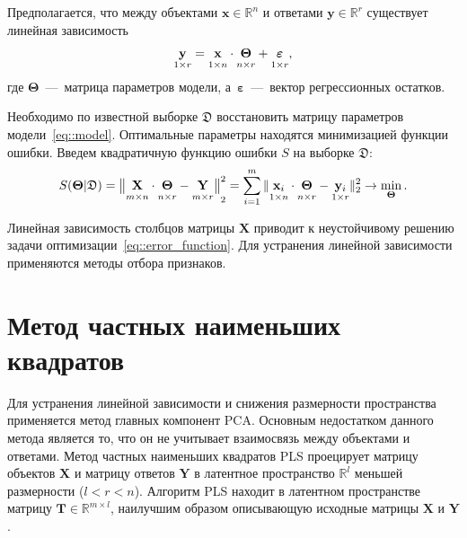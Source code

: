 \documentclass[12pt,twoside]{article}
\newcommand{\bx}{\mathbf{x}}
\newcommand{\by}{\mathbf{y}}
\newcommand{\bY}{\mathbf{Y}}
\newcommand{\bX}{\mathbf{X}}
\newcommand{\bT}{\mathbf{T}}
\newcommand{\bTheta}{\boldsymbol{\Theta}}
\begin{document}
Предполагается, что между объектами $\bx \in \mathbb{R}^n$ и ответами $\by \in \mathbb{R}^r$ существует линейная зависимость 
\begin{equation}
 \underset{1 \times r}{\by} = \underset{1 \times n}{\vphantom{\by}\bx} \cdot \underset{n \times r}{\vphantom{\by}\bTheta} + \underset{1 \times r}{\vphantom{\by}\boldsymbol{\varepsilon}}, 
\label{eq::model}
\end{equation}
где $\bTheta$~---~матрица параметров модели, а~$\boldsymbol{\varepsilon}$~---~вектор регрессионных остатков.

Необходимо по известной выборке $\mathfrak{D}$ восстановить матрицу параметров модели~\eqref{eq::model}.
Оптимальные параметры находятся минимизацией функции ошибки.
Введем квадратичную функцию ошибки $S$ на выборке $\mathfrak{D}$:
\begin{equation}
	S(\bTheta | \mathfrak{D}) = {\bigl\| \underset{m \times n}{\vphantom{\by}\mathbf{X}} \cdot \underset{n \times r}{\vphantom{\by}\bTheta} - \underset{m \times r}{\vphantom{\by}\mathbf{Y}} \bigr\| }_2^2 = \sum_{i=1}^m \| \underset{1 \times n}{\vphantom{\by}\bx_i} \cdot \underset{n \times r}{\vphantom{\by}\bTheta} - \underset{1 \times r}{\vphantom{\by}\by_i} \|_2^2 \rightarrow\min_{\bTheta}.
\label{eq::error_function}
\end{equation}
 
Линейная зависимость столбцов матрицы $\bX$ приводит к неустойчивому решению задачи оптимизации~\eqref{eq::error_function}. Для устранения линейной зависимости применяются методы отбора признаков.

\section{Метод частных наименьших квадратов}

Для устранения линейной зависимости и снижения размерности пространства применяется метод главных компонент PCA. 
Основным недостатком данного метода является то, что он не учитывает взаимосвязь между объектами и ответами.
Метод частных наименьших квадратов PLS проецирует матрицу объектов $\bX$ и матрицу ответов $\bY$ в латентное пространство $\mathbb{R}^l$ меньшей размерности ($l < r < n$).
Алгоритм PLS находит в латентном пространстве матрицу $\bT \in \mathbb{R}^{m \times l}$, наилучшим образом описывающую исходные матрицы $\bX$ и $\bY$.
\end{document}
